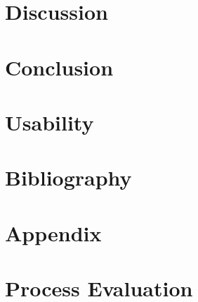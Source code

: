 \documentclass[a4paper,11pt]{article}
\begin{document}
\section{Discussion}

\section{Conclusion}

\section{Usability}

\section{Bibliography}



\section{Appendix}

\section{Process Evaluation}
\end{document}
